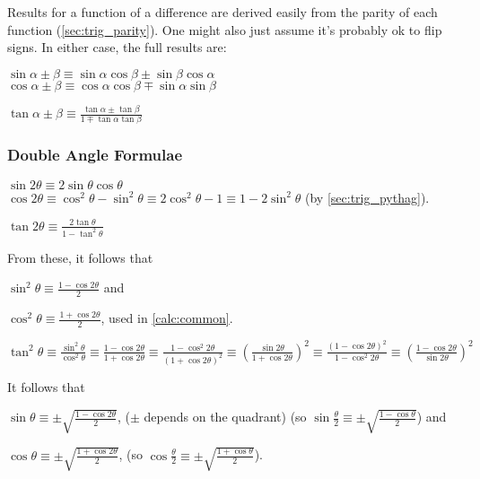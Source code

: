 \documentclass[a4paper,11pt]{article}
\begin{document}
    Results for a function of a difference are derived easily from the parity of
    each function (\ref{sec:trig_parity}). One might also just assume it's
    probably ok to flip signs. In either case, the full results are:

    $\sin \alpha \pm \beta \equiv
       \sin \alpha \cos \beta \pm \sin \beta \cos \alpha$
    \\$\cos \alpha \pm \beta \equiv
       \cos \alpha \cos \beta \mp \sin \alpha \sin \beta$

    $\displaystyle \tan \alpha \pm \beta \equiv
        \frac{\tan \alpha \pm \tan \beta}{1 \mp \tan \alpha \tan \beta}$

    \subsubsection{Double Angle Formulae} \label{sec:trig_double_angle}

    $\sin 2\theta \equiv
       2\sin \theta \cos \theta$
    \\$\cos 2\theta \equiv
       \cos^2 \theta - \sin^2 \theta \equiv
       2\cos^2 \theta - 1 \equiv 1 - 2\sin^2 \theta$ (by \ref{sec:trig_pythag}).

    $\displaystyle \tan 2\theta \equiv
        \frac{2\tan \theta}{1 - \tan^2 \theta}$

    From these, it follows that

    $\displaystyle \sin^2 \theta \equiv
        \frac{1 - \cos 2 \theta} 2$ and

    $\displaystyle \cos^2 \theta \equiv
        \frac{1 + \cos 2 \theta} 2$, used in \ref{calc:common}.

    $\displaystyle \tan^2 \theta \equiv \frac{\sin^2 \theta}{\cos^2 \theta}
        \equiv \frac{1 - \cos 2 \theta}{1 + \cos 2 \theta}
        \equiv \frac{1 - \cos^2 2 \theta}{(1 + \cos 2 \theta)^2}
        \equiv \left(\frac{\sin 2 \theta}{1 + \cos 2 \theta}\right)^2
        \equiv \frac{(1 - \cos 2 \theta)^2}{1 - \cos^2 2 \theta}
        \equiv \left(\frac{1 - \cos 2 \theta}{\sin 2 \theta}\right)^2$

    It follows that

    $\displaystyle \sin \theta \equiv
        \pm\sqrt{\frac{1 - \cos 2 \theta} 2}$, ($\pm$ depends on the quadrant)
    (so $\displaystyle \sin \frac \theta 2 \equiv
        \pm\sqrt{\frac{1 - \cos \theta} 2}$) and

    $\displaystyle \cos \theta \equiv
        \pm\sqrt{\frac{1 + \cos 2 \theta} 2}$, (so
    $\displaystyle \cos \frac \theta 2 \equiv
        \pm\sqrt{\frac{1 + \cos \theta} 2}$).
\end{document}

